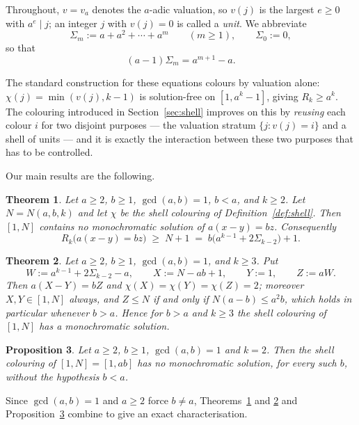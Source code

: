 \documentclass{amsart}
\newtheorem{theorem}{Theorem}
\newtheorem{proposition}[theorem]{Proposition}
\theoremstyle{definition}
\newcommand{\Rk}{R_k}
\begin{document}
Throughout, $v=v_a$ denotes the $a$-adic valuation, so $v(j)$ is the largest
$e\ge0$ with $a^e\mid j$; an integer $j$ with $v(j)=0$ is called a \emph{unit}.
We abbreviate
\[
  \Sigma_m:=a+a^2+\cdots+a^m\qquad(m\ge1),\qquad \Sigma_0:=0,
\]
so that
\begin{equation}\label{eq:sigma}
  (a-1)\Sigma_m=a^{m+1}-a .
\end{equation}

The standard construction for these equations colours by valuation alone:
$\chi(j)=\min(v(j),k-1)$ is solution-free on $[1,a^k-1]$, giving
$\Rk\ge a^k$.  The colouring introduced in Section~\ref{sec:shell} improves on
this by \emph{reusing} each colour $i$ for two disjoint purposes --- the
valuation stratum $\{j: v(j)=i\}$ and a shell of units --- and it is exactly the
interaction between these two purposes that has to be controlled.

Our main results are the following.

\begin{theorem}\label{thm:main}
Let $a\ge2$, $b\ge1$, $\gcd(a,b)=1$, $b<a$, and $k\ge2$.  Let $N=N(a,b,k)$ and
let $\chi$ be the shell colouring of Definition~\ref{def:shell}.  Then $[1,N]$
contains no monochromatic solution of $a(x-y)=bz$.  Consequently
\[
  \Rk\bigl(a(x-y)=bz\bigr)\;\ge\;N+1
    \;=\;b\bigl(a^{k-1}+2\Sigma_{k-2}\bigr)+1 .
\]
\end{theorem}

\begin{theorem}\label{thm:sharp}
Let $a\ge2$, $b\ge1$, $\gcd(a,b)=1$, and $k\ge3$.  Put
\[
  W:=a^{k-1}+2\Sigma_{k-2}-a,\qquad
  X:=N-ab+1,\qquad Y:=1,\qquad Z:=aW .
\]
Then $a(X-Y)=bZ$ and $\chi(X)=\chi(Y)=\chi(Z)=2$; moreover
$X,Y\in[1,N]$ always, and $Z\le N$ if and only if $N(a-b)\le a^2b$, which holds
in particular whenever $b>a$.  Hence for $b>a$ and $k\ge3$ the shell colouring
of $[1,N]$ has a monochromatic solution.
\end{theorem}

\begin{proposition}\label{prop:k2}
Let $a\ge2$, $b\ge1$, $\gcd(a,b)=1$ and $k=2$.  Then the shell colouring of
$[1,N]=[1,ab]$ has no monochromatic solution, for \emph{every} such $b$,
without the hypothesis $b<a$.
\end{proposition}

Since $\gcd(a,b)=1$ and $a\ge2$ force $b\ne a$, Theorems~\ref{thm:main} and
\ref{thm:sharp} and Proposition~\ref{prop:k2} combine to give an exact
characterisation.
\end{document}
